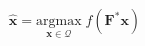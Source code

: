 \documentclass[border=2pt,varwidth]{standalone}
\begin{document}
\[
\hat{\mathbf{x}} =
 \underset{\mathbf{x}\in\mathcal{Q}}{\text{argmax}}
 \; f(\mathbf{F}^* \mathbf{x})
\]
\end{document}
